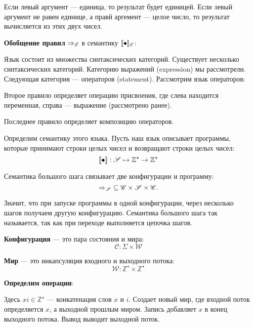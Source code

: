 
Если левый аргумент --- единица, то результат будет единицей. Если левый
аргумент не равен единице, а правй аргемент --- целое число, то результат
вычисляется из этих двух чисел.

\textbf{Обобщение правил} $\neatarrow_\Lexpr$ в семантику
$\llbracket \bullet \rrbracket_{\mathscr{E}}$:


Язык состоит из множества синтаксических категорий.
Существует несколько синтаксических категорий. Категорию выражений (expression) мы
рассмотрели. Следующая категория --- операторов (statement). Рассмотрим язык
операторов:


Второе правило определяет операцию присвоения, где слева находится переменная,
справа --- выражение (рассмотрено ранее).


Последнее правило определяет композицию операторов.

Определим семантику этого языка. Пусть наш язык описывает программы, которые
принимают строки целых чисел и возвращают строки целых чисел:
\[
    \llbracket \bullet \rrbracket : \mathscr{S} \mapsto \mathbb{Z}^\star \to
    \mathbb{Z}^\star
\]

Семантика большого шага связывает две конфигурации и программу:
\[
    \neatarrow_\Lstat\; \subseteq \mathscr{C} \times \Lstat \times
    \mathscr{C}.
\]

Значит, что при запуске программы в одной конфигурации, через несколько
шагов получаем другую конфигурацию. Семантика большого шага так называется, так
как при переходе выполняется цепочка шагов.

\textbf{Конфигурация} --- это пара состояния и мира:
\[
    \mathscr{C} : \Sigma \times \mathscr{W}
\]

\textbf{Мир} --- это инкапсуляция входного и выходного потока:
\[
    \mathscr{W} : \mathbb{Z}^\star \times \mathbb{Z}^\star
\]

\textbf{Определим операции}:


Здесь $xi \in \mathbb{Z}^\star$ --- конкатенация слов $x$ и $i$. Создает новый
мир, где входной поток определяется $x$, а выходной прошлым миром. Запись
добавляет $x$ в конец выходного потока. Вывод выводит выходной поток.


